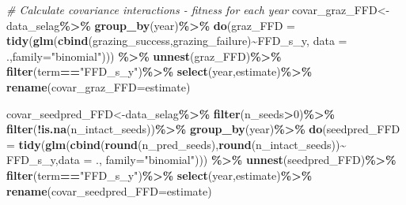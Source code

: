 \documentclass[
]{article}
\newenvironment{Shaded}{\begin{snugshade}}{\end{snugshade}}
\newcommand{\CommentTok}[1]{\textcolor[rgb]{0.56,0.35,0.01}{\textit{#1}}}
\newcommand{\DataTypeTok}[1]{\textcolor[rgb]{0.13,0.29,0.53}{#1}}
\newcommand{\DecValTok}[1]{\textcolor[rgb]{0.00,0.00,0.81}{#1}}
\newcommand{\KeywordTok}[1]{\textcolor[rgb]{0.13,0.29,0.53}{\textbf{#1}}}
\newcommand{\NormalTok}[1]{#1}
\newcommand{\OperatorTok}[1]{\textcolor[rgb]{0.81,0.36,0.00}{\textbf{#1}}}
\newcommand{\StringTok}[1]{\textcolor[rgb]{0.31,0.60,0.02}{#1}}
\begin{document}
\begin{Shaded}
\begin{Highlighting}[]
\CommentTok{\# Calculate covariance interactions {-} fitness for each  year}
\NormalTok{covar\_graz\_FFD\textless{}{-}data\_selag}\OperatorTok{\%\textgreater{}\%}
\StringTok{  }\KeywordTok{group\_by}\NormalTok{(year)}\OperatorTok{\%\textgreater{}\%}
\StringTok{  }\KeywordTok{do}\NormalTok{(}\DataTypeTok{graz\_FFD =} \KeywordTok{tidy}\NormalTok{(}\KeywordTok{glm}\NormalTok{(}\KeywordTok{cbind}\NormalTok{(grazing\_success,grazing\_failure)}\OperatorTok{\textasciitilde{}}\NormalTok{FFD\_s\_y, }
                             \DataTypeTok{data =}\NormalTok{ .,}\DataTypeTok{family=}\StringTok{"binomial"}\NormalTok{))) }\OperatorTok{\%\textgreater{}\%}\StringTok{ }
\StringTok{  }\KeywordTok{unnest}\NormalTok{(graz\_FFD)}\OperatorTok{\%\textgreater{}\%}
\StringTok{  }\KeywordTok{filter}\NormalTok{(term}\OperatorTok{==}\StringTok{"FFD\_s\_y"}\NormalTok{)}\OperatorTok{\%\textgreater{}\%}
\StringTok{  }\KeywordTok{select}\NormalTok{(year,estimate)}\OperatorTok{\%\textgreater{}\%}
\StringTok{  }\KeywordTok{rename}\NormalTok{(}\DataTypeTok{covar\_graz\_FFD=}\NormalTok{estimate)}

\NormalTok{covar\_seedpred\_FFD\textless{}{-}data\_selag}\OperatorTok{\%\textgreater{}\%}
\StringTok{  }\KeywordTok{filter}\NormalTok{(n\_seeds}\OperatorTok{\textgreater{}}\DecValTok{0}\NormalTok{)}\OperatorTok{\%\textgreater{}\%}
\StringTok{  }\KeywordTok{filter}\NormalTok{(}\OperatorTok{!}\KeywordTok{is.na}\NormalTok{(n\_intact\_seeds))}\OperatorTok{\%\textgreater{}\%}
\StringTok{  }\KeywordTok{group\_by}\NormalTok{(year)}\OperatorTok{\%\textgreater{}\%}
\StringTok{  }\KeywordTok{do}\NormalTok{(}\DataTypeTok{seedpred\_FFD =} \KeywordTok{tidy}\NormalTok{(}\KeywordTok{glm}\NormalTok{(}\KeywordTok{cbind}\NormalTok{(}\KeywordTok{round}\NormalTok{(n\_pred\_seeds),}\KeywordTok{round}\NormalTok{(n\_intact\_seeds))}\OperatorTok{\textasciitilde{}}
\StringTok{                               }\NormalTok{FFD\_s\_y,}\DataTypeTok{data =}\NormalTok{ .,}
                             \DataTypeTok{family=}\StringTok{"binomial"}\NormalTok{))) }\OperatorTok{\%\textgreater{}\%}\StringTok{ }
\StringTok{  }\KeywordTok{unnest}\NormalTok{(seedpred\_FFD)}\OperatorTok{\%\textgreater{}\%}
\StringTok{  }\KeywordTok{filter}\NormalTok{(term}\OperatorTok{==}\StringTok{"FFD\_s\_y"}\NormalTok{)}\OperatorTok{\%\textgreater{}\%}
\StringTok{  }\KeywordTok{select}\NormalTok{(year,estimate)}\OperatorTok{\%\textgreater{}\%}
\StringTok{  }\KeywordTok{rename}\NormalTok{(}\DataTypeTok{covar\_seedpred\_FFD=}\NormalTok{estimate)}


\end{Highlighting}
\end{Shaded}
\end{document}
